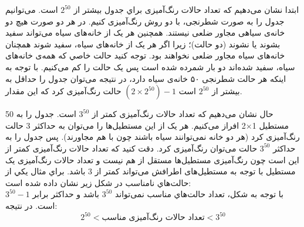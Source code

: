     \p
    ابتدا نشان می‌دهیم که تعداد حالات رنگ‌آمیزی براي جدول بیشتر از 
    $2^{50}$
    است.
  می‌توانیم جدول را به صورت شطرنجی، با دو روش رنگ‌آمیزی ‌کنیم. در هر دو صورت هیچ دو خانه‌ی سیاهی مجاور ضلعی نیستند. همچنین هر یک از خانه‌های سیاه می‌تواند سفید بشوند یا نشوند (دو حالت)؛ زیرا اگر هر یک از خانه‌های سیاه، سفید شوند همچنان خانه‌های سیاه مجاور ضلعی نخواهند بود. 
  ‌توجه كنيد حالت خاصي كه همه‌ی خانه‌های سیاه، سفید شده‌اند دو بار شمرده شده است پس یک حالت را کم می‌کنیم.
  با توجه به اینکه هر حالت شطرنجی ۵۰ خانه‌ی سیاه دارد، در نتیجه می‌توان جدول را حداقل به
   $ (2 \times 2^{50})- 1 $ 
   حالت رنگ‌آمیزی کرد که این مقدار‎
    بیشتر از 
   $2^{50}$
  است.

    \p
     حال نشان می‌دهیم که تعداد حالات رنگ‌آمیزی کمتر از 
     $3^{50}$
     است.
      جدول را به 50 مستطیل 1×2 افراز می‌کنیم. هر یک از این مستطیل‌ها را می‌توان به حداکثر 3 حالت رنگ‌آمیزی کرد (هر دو خانه نمی‌توانند سیاه باشند چون با هم مجاورند). پس جدول را به حداکثر $3^{50}$ حالت می‌توان رنگ‌آمیزی کرد. دقت کنید که تعداد حالات رنگ‌آمیزی کمتر از این است چون رنگ‌آمیزی مستطیل‌ها مستقل از هم نیست و تعداد حالات رنگ‌آمیزی یک مستطیل با توجه به مستطیل‌های اطرافش می‌تواند کمتر از 3 باشد.
     براي مثال يكي از حالت‌هاي نامناسب در شكل زير نشان داده شده است:
     \\  
      با توجه به شكل، تعداد حالت‌هاي مناسب نمی‌تواند  
      $3^{50}$
       باشد و حداکثر برابر
      $3^{50}-1$
     است.
    \p
    در نتیجه:
    $$2^{50} < \text{تعداد حالات رنگ‌آمیزی مناسب} < 3^{50}$$
